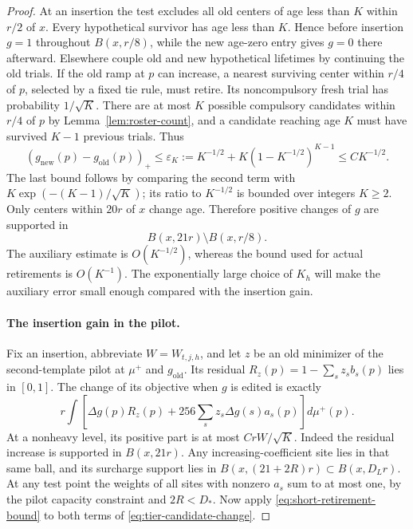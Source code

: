 \begin{proof}
At an insertion the test excludes all old centers of age less than
\(K\) within \(r/2\) of \(x\).  Every hypothetical survivor has age
less than \(K\).  Hence before insertion \(g=1\) throughout
\(B(x,r/8)\), while the new age-zero entry gives \(g=0\) there afterward.
Elsewhere couple old and new hypothetical lifetimes by continuing the
old trials.  If the old ramp at \(p\) can increase, a nearest surviving
center within \(r/4\) of \(p\), selected by a fixed tie rule, must
retire.  Its noncompulsory fresh trial has probability \(1/\sqrt K\).
There are at most \(K\) possible compulsory candidates within \(r/4\)
of \(p\) by Lemma~\ref{lem:roster-count}, and a candidate reaching age
\(K\) must have survived \(K-1\) previous trials.  Thus
\begin{equation}\label{eq:short-retirement-bound}
 (g_{\mathrm{new}}(p)-g_{\mathrm{old}}(p))_+
 \le\varepsilon_K:=K^{-1/2}+K(1-K^{-1/2})^{K-1}
 \le C K^{-1/2}.
\end{equation}
The last bound follows by comparing the second term with
\(K\exp(-(K-1)/\sqrt K)\); its ratio to \(K^{-1/2}\) is bounded
over integers \(K\ge2\).  Only centers within \(20r\) of \(x\)
change age.  Therefore positive changes of \(g\) are supported in
\begin{equation}\label{eq:short-positive-support}
 B(x,21r)\setminus B(x,r/8).
\end{equation}
The auxiliary estimate is $O(K^{-1/2})$, whereas the bound used for
actual retirements is $O(K^{-1})$.  The exponentially large choice
of $K_h$ will make the auxiliary error small enough compared with
the insertion gain.

\paragraph{The insertion gain in the pilot.}
Fix an insertion, abbreviate \(W=W_{t,j,h}\), and let \(z\) be an old
minimizer of the second-template pilot at \(\mu^+\) and
\(g_{\mathrm{old}}\).  Its residual
\(R_z(p)=1-\sum_s z_s b_s(p)\) lies in \([0,1]\).  The change of
its objective when \(g\) is edited is exactly
\begin{equation}\label{eq:tier-candidate-change}
 r\int\left[
   \Delta g(p)R_z(p)+256\sum_s z_s\Delta g(s)a_s(p)
 \right]d\mu^+(p).
\end{equation}
At a nonheavy level, its positive part is at most
\(CrW/\sqrt K\).  Indeed the residual increase is supported in
\(B(x,21r)\).  Any increasing-coefficient site lies in that same
ball, and its surcharge support lies in
\(B(x,(21+2R)r)\subset B(x,D_Lr)\).  At any test point the weights
of all sites with nonzero \(a_s\) sum to at most one, by the pilot
capacity constraint and \(2R<D_*\).  Now apply
\eqref{eq:short-retirement-bound} to both terms of
\eqref{eq:tier-candidate-change}.


\end{proof}
